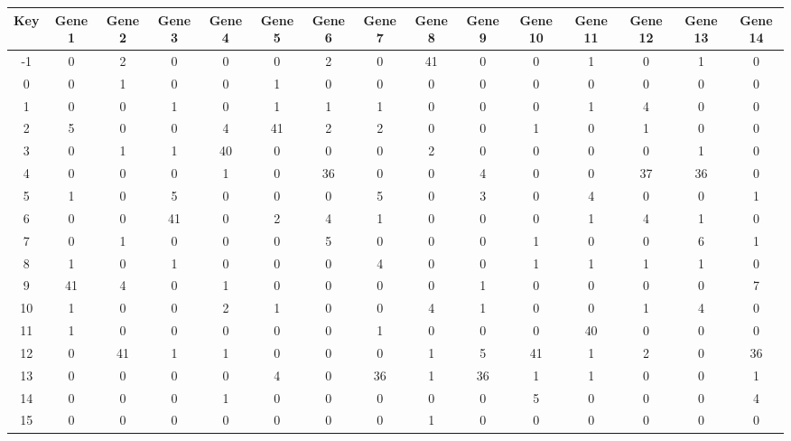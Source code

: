 \begin{tabular}{|c|c|c|c|c|c|c|c|c|c|c|c|c|c|c|}
\hline
Key & Gene 1 & Gene 2 & Gene 3 & Gene 4 & Gene 5 & Gene 6 & Gene 7 & Gene 8 & Gene 9 & Gene 10 & Gene 11 & Gene 12 & Gene 13 & Gene 14 \\
\hline
-1 & 0 & 2 & 0 & 0 & 0 & 2 & 0 & 41 & 0 & 0 & 1 & 0 & 1 & 0 \\
0 & 0 & 1 & 0 & 0 & 1 & 0 & 0 & 0 & 0 & 0 & 0 & 0 & 0 & 0 \\
1 & 0 & 0 & 1 & 0 & 1 & 1 & 1 & 0 & 0 & 0 & 1 & 4 & 0 & 0 \\
2 & 5 & 0 & 0 & 4 & 41 & 2 & 2 & 0 & 0 & 1 & 0 & 1 & 0 & 0 \\
3 & 0 & 1 & 1 & 40 & 0 & 0 & 0 & 2 & 0 & 0 & 0 & 0 & 1 & 0 \\
4 & 0 & 0 & 0 & 1 & 0 & 36 & 0 & 0 & 4 & 0 & 0 & 37 & 36 & 0 \\
5 & 1 & 0 & 5 & 0 & 0 & 0 & 5 & 0 & 3 & 0 & 4 & 0 & 0 & 1 \\
6 & 0 & 0 & 41 & 0 & 2 & 4 & 1 & 0 & 0 & 0 & 1 & 4 & 1 & 0 \\
7 & 0 & 1 & 0 & 0 & 0 & 5 & 0 & 0 & 0 & 1 & 0 & 0 & 6 & 1 \\
8 & 1 & 0 & 1 & 0 & 0 & 0 & 4 & 0 & 0 & 1 & 1 & 1 & 1 & 0 \\
9 & 41 & 4 & 0 & 1 & 0 & 0 & 0 & 0 & 1 & 0 & 0 & 0 & 0 & 7 \\
10 & 1 & 0 & 0 & 2 & 1 & 0 & 0 & 4 & 1 & 0 & 0 & 1 & 4 & 0 \\
11 & 1 & 0 & 0 & 0 & 0 & 0 & 1 & 0 & 0 & 0 & 40 & 0 & 0 & 0 \\
12 & 0 & 41 & 1 & 1 & 0 & 0 & 0 & 1 & 5 & 41 & 1 & 2 & 0 & 36 \\
13 & 0 & 0 & 0 & 0 & 4 & 0 & 36 & 1 & 36 & 1 & 1 & 0 & 0 & 1 \\
14 & 0 & 0 & 0 & 1 & 0 & 0 & 0 & 0 & 0 & 5 & 0 & 0 & 0 & 4 \\
15 & 0 & 0 & 0 & 0 & 0 & 0 & 0 & 1 & 0 & 0 & 0 & 0 & 0 & 0 \\
\hline
\end{tabular}